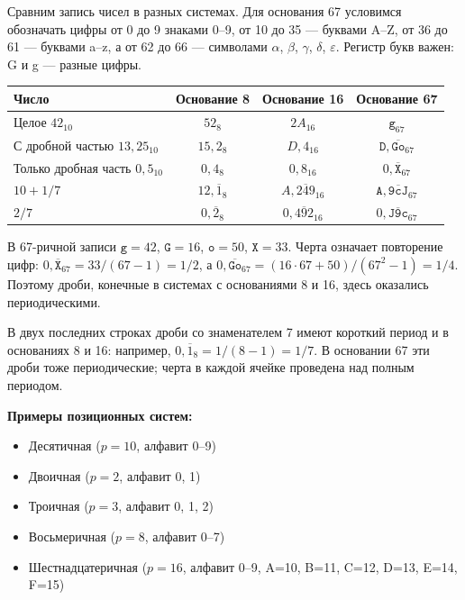 Сравним запись чисел в разных системах. Для основания 67 условимся обозначать цифры от 0 до 9 знаками 0--9, от 10 до 35 — буквами A--Z, от 36 до 61 — буквами a--z, а от 62 до 66 — символами $\alpha$, $\beta$, $\gamma$, $\delta$, $\varepsilon$. Регистр букв важен: G и g — разные цифры.

\begin{center}
\begin{tabular}{lccc}
Число & Основание 8 & Основание 16 & Основание 67 \\
\hline
Целое $42_{10}$ & $52_8$ & $2A_{16}$ & $\mathtt{g}_{67}$ \\
С дробной частью $13{,}25_{10}$ & $15{,}2_8$ & $D{,}4_{16}$ & $\mathtt{D}{,}\overline{\mathtt{Go}}_{67}$ \\
Только дробная часть $0{,}5_{10}$ & $0{,}4_8$ & $0{,}8_{16}$ & $0{,}\overline{\mathtt{X}}_{67}$ \\
\hline
$10+1/7$ & $12{,}\overline{1}_8$ & $A{,}\overline{249}_{16}$ & $\mathtt{A}{,}\overline{\mathtt{9cJ}}_{67}$ \\
$2/7$ & $0{,}\overline{2}_8$ & $0{,}\overline{492}_{16}$ & $0{,}\overline{\mathtt{J9c}}_{67}$
\end{tabular}
\end{center}

В 67-ричной записи $\mathtt{g}=42$, $\mathtt{G}=16$, $\mathtt{o}=50$, $\mathtt{X}=33$. Черта означает повторение цифр: $0{,}\overline{\mathtt{X}}_{67}=33/(67-1)=1/2$, а $0{,}\overline{\mathtt{Go}}_{67}=(16\cdot67+50)/(67^2-1)=1/4$. Поэтому дроби, конечные в системах с основаниями 8 и 16, здесь оказались периодическими.

В двух последних строках дроби со знаменателем 7 имеют короткий период и в основаниях 8 и 16: например, $0{,}\overline{1}_8=1/(8-1)=1/7$. В основании 67 эти дроби тоже периодические; черта в каждой ячейке проведена над полным периодом.

\textbf{Примеры позиционных систем:}
\begin{itemize}
    \item Десятичная ($p = 10$, алфавит 0--9)
    \item Двоичная ($p = 2$, алфавит 0, 1)
    \item Троичная ($p = 3$, алфавит 0, 1, 2)
    \item Восьмеричная ($p = 8$, алфавит 0--7)
    \item Шестнадцатеричная ($p = 16$, алфавит 0--9, A=10, B=11, C=12, D=13, E=14, F=15)
\end{itemize}

